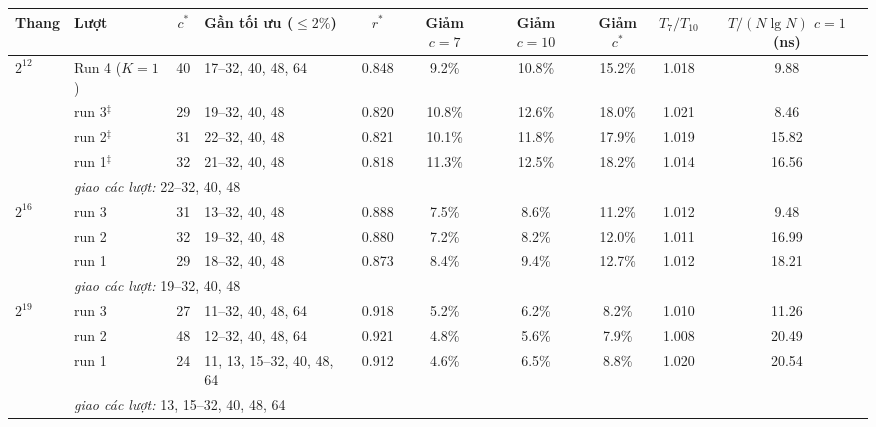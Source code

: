 \begin{tabularx}{\linewidth}{llcXcccccc}
\toprule
Thang & Lượt & $c^*$ & \makecell{Gần tối ưu \\ ($\le2\%$)} & $r^*$ & \makecell{Giảm \\ $c{=}7$} & \makecell{Giảm \\ $c{=}10$} & \makecell{Giảm \\ $c^*$} & $T_7/T_{10}$ & \makecell{$T/(N\lg N)$ \\ $c{=}1$ (ns)} \\
\midrule
$2^{12}$ & Run 4 ($K{=}1$) & 40 & 17--32, 40, 48, 64 & 0.848 & 9.2\% & 10.8\% & 15.2\% & 1.018 & 9.88 \\
 & run 3$^{\ddagger}$ & 29 & 19--32, 40, 48 & 0.820 & 10.8\% & 12.6\% & 18.0\% & 1.021 & 8.46 \\
 & run 2$^{\ddagger}$ & 31 & 22--32, 40, 48 & 0.821 & 10.1\% & 11.8\% & 17.9\% & 1.019 & 15.82 \\
 & run 1$^{\ddagger}$ & 32 & 21--32, 40, 48 & 0.818 & 11.3\% & 12.5\% & 18.2\% & 1.014 & 16.56 \\
 & \multicolumn{9}{l}{\textit{giao các lượt:} 22--32, 40, 48} \\
\addlinespace
$2^{16}$ & run 3 & 31 & 13--32, 40, 48 & 0.888 & 7.5\% & 8.6\% & 11.2\% & 1.012 & 9.48 \\
 & run 2 & 32 & 19--32, 40, 48 & 0.880 & 7.2\% & 8.2\% & 12.0\% & 1.011 & 16.99 \\
 & run 1 & 29 & 18--32, 40, 48 & 0.873 & 8.4\% & 9.4\% & 12.7\% & 1.012 & 18.21 \\
 & \multicolumn{9}{l}{\textit{giao các lượt:} 19--32, 40, 48} \\
\addlinespace
$2^{19}$ & run 3 & 27 & 11--32, 40, 48, 64 & 0.918 & 5.2\% & 6.2\% & 8.2\% & 1.010 & 11.26 \\
 & run 2 & 48 & 12--32, 40, 48, 64 & 0.921 & 4.8\% & 5.6\% & 7.9\% & 1.008 & 20.49 \\
 & run 1 & 24 & 11, 13, 15--32, 40, 48, 64 & 0.912 & 4.6\% & 6.5\% & 8.8\% & 1.020 & 20.54 \\
 & \multicolumn{9}{l}{\textit{giao các lượt:} 13, 15--32, 40, 48, 64} \\
\bottomrule
\end{tabularx}
